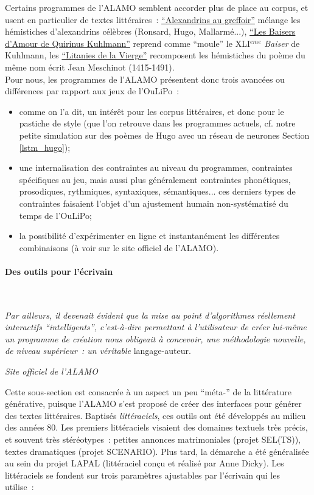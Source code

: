 \documentclass{article}
\newcommand{\subsubsubsection}[1]{\paragraph{#1}\mbox{}\\}
\newenvironment{citationbox}
{\begin{center}
		\begin{minipage}{.8\textwidth}
		}
		{
		\end{minipage}	
\end{center}
}
\begin{document}
					Certains programmes de l'ALAMO semblent accorder plus de place au corpus, et usent en particulier de textes littéraires~: \href{http://www.alamo.free.fr/pmwiki.php?n=Programmes.AlexandrinsAuGreffoir}{``Alexandrins au greffoir''} mélange les hémistiches d'alexandrins célèbres (Ronsard, Hugo, Mallarmé...), \href{http://www.alamo.free.fr/pmwiki.php?n=Programmes.BaiserDeKuhlman}{``Les Baisers d'Amour de Quirinus Kuhlmann''} reprend comme ``moule'' le XLI$^{eme}$ \textit{Baiser} de Kuhlmann, les \href{http://www.alamo.free.fr/pmwiki.php?n=Programmes.LitaniesDeLaVierge}{``Litanies de la Vierge''} recomposent les hémistiches du poème du même nom écrit Jean Meschinot (1415-1491).\\
					
					Pour nous, les programmes de l'ALAMO présentent donc trois avancées ou différences par rapport aux jeux de l'OuLiPo~:
					\vspace{2mm}
					\begin{itemize}
						\item comme on l'a dit, un intérêt pour les corpus littéraires, et donc pour le pastiche de style (que l'on retrouve dans les programmes actuels, cf. notre petite simulation sur des poèmes de Hugo avec un réseau de neurones Section \ref{lstm_hugo});
						\item une internalisation des contraintes au niveau du programmes, contraintes spécifiques au jeu, mais aussi plus généralement contraintes phonétiques, prosodiques, rythmiques, syntaxiques, sémantiques... ces derniers types de contraintes faisaient l'objet d'un ajustement humain non-systématisé du temps de l'OuLiPo;
						\item la possibilité d'expérimenter en ligne et instantanément les différentes combinaisons (à voir sur le site officiel de l'ALAMO).
					\end{itemize}
				\subsubsubsection{Des outils pour l'écrivain}
					\begin{citationbox}
						\textit{Par ailleurs, il devenait évident que la mise au point d'algorithmes réellement interactifs ``intelligents'', c’est-à-dire permettant à l’utilisateur de créer lui-même un programme de création nous obligeait à concevoir, une méthodologie nouvelle, de niveau supérieur~: un véritable} langage-auteur.
						\begin{flushright}
							\textit{Site officiel de l'ALAMO} \cite{alamo}
						\end{flushright}
					\end{citationbox}
					Cette sous-section est consacrée à un aspect un peu ``méta-'' de la littérature générative, puisque l'ALAMO s'est proposé de créer des interfaces pour générer des textes littéraires. Baptisés \textit{littéraciels}, ces outils ont été développés au milieu des années 80. Les premiers littéraciels visaient des domaines textuels très précis, et souvent très stéréotypes~: petites annonces matrimoniales (projet SEL(TS)), textes dramatiques (projet SCENARIO). Plus tard, la démarche a été généralisée au sein du projet LAPAL (littéraciel conçu et réalisé par Anne Dicky). Les littéraciels se fondent sur trois paramètres ajustables par l'écrivain qui les utilise~:
\end{document}
